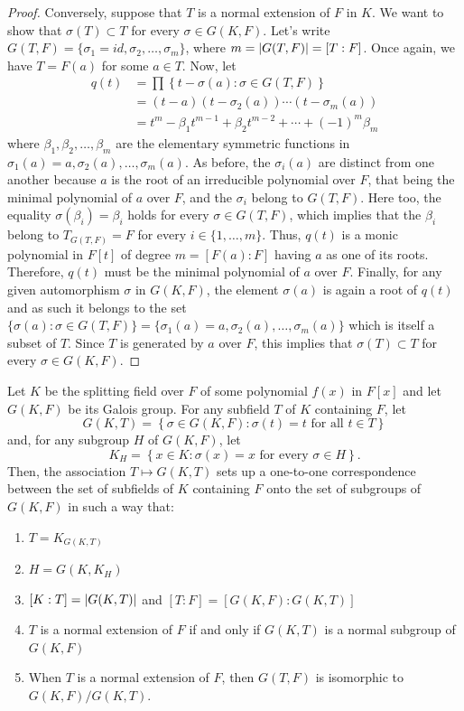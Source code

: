 \begin{proof}
	Conversely, suppose that $T$ is a normal extension of $F$ in $K$. We want to show that ${\sigma(T)}\subset{T}$ for every ${\sigma}\in{G(K,F)}$. Let's write $G(T,F)=\{\sigma_{1}=id,\sigma_{2},\ldots,\sigma_{m}\}$, where $m=\lvert G(T,F)\rvert=[T:F]$. Once again, we have $T=F(a)$ for some ${a}\in{T}$. Now, let
	\begin{align*}
		q(t)
		 & =
		\prod\left\{t-\sigma(a):{\sigma}\in{G(T,F)}\right\}
		\\
		 & =
		(t-a)(t-\sigma_{2}(a))\cdots(t-\sigma_{m}(a))
		\\
		 & =
		t^{m}-\beta_{1}t^{m-1}+\beta_{2}t^{m-2}+\cdots+(-1)^{m}\beta_{m}
	\end{align*}
	where $\beta_{1},\beta_{2},\ldots,\beta_{m}$ are the elementary symmetric functions in $\sigma_{1}(a)=a,\sigma_{2}(a),\ldots,\sigma_{m}(a)$. As before, the $\sigma_{i}(a)$ are distinct from one another because $a$ is the root of an irreducible polynomial over $F$, that being the minimal polynomial of $a$ over $F$, and the $\sigma_{i}$ belong to $G(T,F)$. Here too, the equality $\sigma(\beta_{i})=\beta_{i}$ holds for every ${\sigma}\in{G(T,F)}$, which implies that the $\beta_{i}$ belong to $T_{G(T,F)}=F$ for every ${i}\in{\{1,\ldots,m\}}$. Thus, $q(t)$ is a monic polynomial in $F[t]$ of degree $m=[F(a):F]$ having $a$ as one of its roots. Therefore, $q(t)$ must be the minimal polynomial of $a$ over $F$. Finally, for any given automorphism $\sigma$ in $G(K,F)$, the element $\sigma(a)$ is again a root of $q(t)$ and as such it belongs to the set ${\{\sigma(a):{\sigma}\in{G(T,F)}\}}=\{\sigma_{1}(a)=a,\sigma_{2}(a),\ldots,\sigma_{m}(a)\}$ which is itself a subset of $T$. Since $T$ is generated by $a$ over $F$, this implies that ${\sigma(T)}\subset{T}$ for every ${\sigma}\in{G(K,F)}$.
\end{proof}

\begin{theorem}\label{thm:galois-correspondence}
	Let $K$ be the splitting field over $F$ of some polynomial ${f(x)}$ in $F[x]$ and let $G(K,F)$ be its Galois group. For any subfield $T$ of $K$ containing $F$, let
	\[
		G(K,T)=\left\{{\sigma}\in{G(K,F)}:\sigma(t)=t\text{ for all }{t}\in{T}\right\}
	\]
	and, for any subgroup $H$ of $G(K,F)$, let
	\[
		K_{H}=\left\{{x}\in{K}:\sigma(x)=x\text{ for every }{\sigma}\in{H}\right\}.
	\]
	Then, the association ${T}\mapsto{G(K,T)}$ sets up a one-to-one correspondence between the set of subfields of $K$ containing $F$ onto the set of subgroups of $G(K,F)$ in such a way that:
	\begin{enumerate}
		\item $T=K_{G(K,T)}$
		\item $H=G(K,K_{H})$
		\item $[K:T]=\lvert G(K,T)\rvert$ and $[T:F]=[G(K,F):G(K,T)]$
		\item $T$ is a normal extension of $F$ if and only if $G(K,T)$ is a normal subgroup of $G(K,F)$
		\item When $T$ is a normal extension of $F$, then $G(T,F)$ is isomorphic to $G(K,F)/G(K,T)$.
	\end{enumerate}
\end{theorem}

